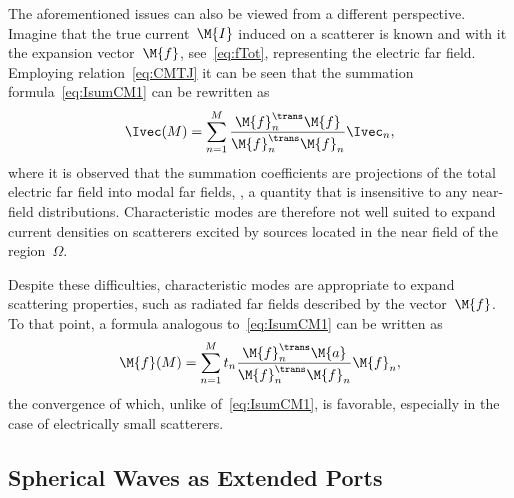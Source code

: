 \documentclass[journal]{IEEEtran}
\begin{document}
The aforementioned issues can also be viewed from a different perspective. Imagine that the true current~$\M{I}$ induced on a scatterer is known and with it the expansion vector~$\M{f}$, see~\eqref{eq:fTot}, representing the electric far field. Employing relation~\eqref{eq:CMTJ} it can be seen that the summation formula~\eqref{eq:IsumCM1} can be rewritten as
\begin{equation}
\Ivec (M) = \sum\limits_{n=1}^M \dfrac{\M{f}_n^\trans \M{f}}{\M{f}_n^\trans \M{f}_n} \Ivec_n,
\end{equation}
where it is observed that the summation coefficients are projections of the total electric far field into modal far fields, \ie{}, a quantity that is insensitive to any near-field distributions. Characteristic modes are therefore not well suited to expand current densities on scatterers excited by sources located in the near field of the region~$\varOmega$.

Despite these difficulties, characteristic modes are appropriate to expand scattering properties, such as radiated far fields described by the vector~$\M{f}$. To that point, a formula analogous to~\eqref{eq:IsumCM1} can be written as
\begin{equation}
\M{f} (M)  =  \sum\limits_{n=1}^M t_n \dfrac{\M{f}_n^\trans \M{a}}{\M{f}_n^\trans \M{f}_n} \M{f}_n,
\label{eq:fsum}
\end{equation}
the convergence of which, unlike of~\eqref{eq:IsumCM1}, is favorable, especially in the case of electrically small scatterers.

\subsection{Spherical Waves as Extended Ports}
\label{sec:disc:unif}
\end{document}
